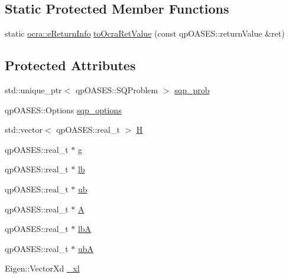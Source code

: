 \subsection*{Static Protected Member Functions}
\begin{DoxyCompactItemize}
\item 
static \hyperlink{namespaceocra_aa1d873ac30cb0a0f79ba978745de294b}{ocra\+::e\+Return\+Info} \hyperlink{classocra_1_1OneLevelSolverWithQPOASES_a8fa99c1dbded56a7ecc69a3d756f1277}{to\+Ocra\+Ret\+Value} (const qp\+O\+A\+S\+E\+S\+::return\+Value \&ret)
\end{DoxyCompactItemize}
\subsection*{Protected Attributes}
\begin{DoxyCompactItemize}
\item 
std\+::unique\+\_\+ptr$<$ qp\+O\+A\+S\+E\+S\+::\+S\+Q\+Problem $>$ \hyperlink{classocra_1_1OneLevelSolverWithQPOASES_ad432bd42a6211d668efc3b2e2d3df238}{sqp\+\_\+prob}
\item 
qp\+O\+A\+S\+E\+S\+::\+Options \hyperlink{classocra_1_1OneLevelSolverWithQPOASES_ace333e6d7333a5bcd9c7be5bc7d98c7b}{sqp\+\_\+options}
\item 
std\+::vector$<$ qp\+O\+A\+S\+E\+S\+::real\+\_\+t $>$ \hyperlink{classocra_1_1OneLevelSolverWithQPOASES_aba3bdf7d777d9e3e8015570652cf396a}{H}
\item 
qp\+O\+A\+S\+E\+S\+::real\+\_\+t $\ast$ \hyperlink{classocra_1_1OneLevelSolverWithQPOASES_a56fea8397d0c6b40fee373d8863f0b26}{g}
\item 
qp\+O\+A\+S\+E\+S\+::real\+\_\+t $\ast$ \hyperlink{classocra_1_1OneLevelSolverWithQPOASES_a82eaebae8f92464066e9b5348b1737f9}{lb}
\item 
qp\+O\+A\+S\+E\+S\+::real\+\_\+t $\ast$ \hyperlink{classocra_1_1OneLevelSolverWithQPOASES_a53854c9775b3ff65f4a0621bab17613c}{ub}
\item 
qp\+O\+A\+S\+E\+S\+::real\+\_\+t $\ast$ \hyperlink{classocra_1_1OneLevelSolverWithQPOASES_a8263c27c6bda731ab9dc9550a668e491}{A}
\item 
qp\+O\+A\+S\+E\+S\+::real\+\_\+t $\ast$ \hyperlink{classocra_1_1OneLevelSolverWithQPOASES_a268dd33567d130672824404fdf98882a}{lbA}
\item 
qp\+O\+A\+S\+E\+S\+::real\+\_\+t $\ast$ \hyperlink{classocra_1_1OneLevelSolverWithQPOASES_a2cb624cfce8e1940c5107251418ee7dd}{ubA}
\item 
Eigen\+::\+Vector\+Xd \hyperlink{classocra_1_1OneLevelSolverWithQPOASES_a67a41fa1b101ce2885012b796c8bfe47}{\+\_\+xl}

\end{DoxyCompactItemize}
